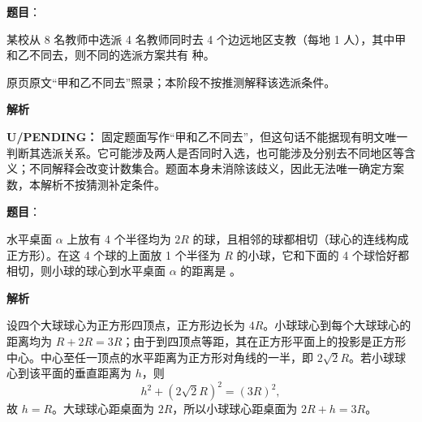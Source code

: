 \begin{answer}

\textbf{题目}：

某校从 8 名教师中选派 4 名教师同时去 4 个边远地区支教（每地 1 人），其中甲和乙不同去，则不同的选派方案共有 \gkblank{} 种。

\begin{gktip}
原页原文“甲和乙不同去”照录；本阶段不按推测解释该选派条件。
\end{gktip}

\textbf{解析}

\textbf{U/PENDING：} 固定题面写作“甲和乙不同去”，但这句话不能据现有明文唯一判断其选派关系。它可能涉及两人是否同时入选，也可能涉及分别去不同地区等含义；不同解释会改变计数集合。题面本身未消除该歧义，因此无法唯一确定方案数，本解析不按猜测补定条件。


\end{answer}
\begin{answer}

\textbf{题目}：

水平桌面 \(\alpha\) 上放有 4 个半径均为 \(2R\) 的球，且相邻的球都相切（球心的连线构成正方形）。在这 4 个球的上面放 1 个半径为 \(R\) 的小球，它和下面的 4 个球恰好都相切，则小球的球心到水平桌面 \(\alpha\) 的距离是 \gkblank{}。

\textbf{解析}

设四个大球球心为正方形四顶点，正方形边长为 $4R$。小球球心到每个大球球心的距离均为 $R+2R=3R$；由于到四顶点等距，其在正方形平面上的投影是正方形中心。中心至任一顶点的水平距离为正方形对角线的一半，即 $2\sqrt2R$。若小球球心到该平面的垂直距离为 $h$，则
\nopagebreak[4]
\[
h^2+(2\sqrt2R)^2=(3R)^2,
\]
故 $h=R$。大球球心距桌面为 $2R$，所以小球球心距桌面为 $2R+h=3R$。


\end{answer}
